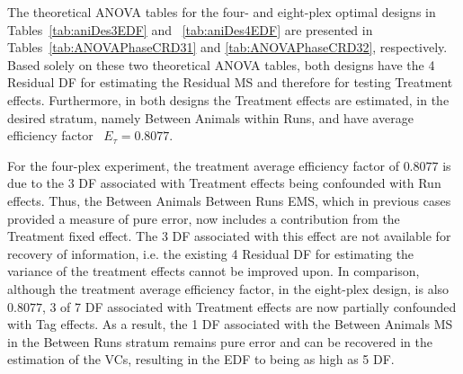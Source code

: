 The theoretical ANOVA tables for the four- and eight-plex optimal designs in Tables~\ref{tab:aniDes3EDF} and ~\ref{tab:aniDes4EDF} are presented in Tables~\ref{tab:ANOVAPhaseCRD31} and \ref{tab:ANOVAPhaseCRD32}, respectively. Based solely on these two theoretical ANOVA tables, both designs have the 4 Residual DF for estimating the Residual MS and therefore for testing Treatment effects. Furthermore, in both designs the Treatment effects are estimated, in the desired stratum, namely Between Animals within Runs, and have average efficiency factor \ $E_\tau = 0.8077$. 

For the four-plex experiment, the treatment average efficiency factor of $0.8077$ is due to the 3 DF associated with Treatment effects being confounded with Run effects. Thus, the Between Animals Between Runs EMS, which in previous cases provided a measure of pure error, now includes a contribution from the Treatment fixed effect. The 3 DF associated with this effect are not available for recovery of information, i.e. the existing 4 Residual DF for estimating the variance of the treatment effects cannot be improved upon. In comparison, although the treatment average efficiency factor, in the eight-plex design, is also $0.8077$, 3 of 7 DF associated with Treatment effects are now partially confounded with Tag effects. As a result, the 1 DF associated with the Between Animals MS in the Between Runs stratum remains pure error and can be recovered in the estimation of the VCs, resulting in the EDF to being as high as 5 DF. 



